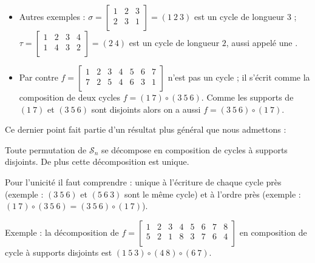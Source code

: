 \documentclass{book}
\begin{document}
\begin{itemize}
  \item Autres exemples :
$
\sigma = \left[\begin{smallmatrix}
 1 & 2 & 3 \\
 2 & 3 & 1 \\
        \end{smallmatrix} \right]
= (1\ 2\ 3)$ est un cycle de longueur $3$ ;
$
\tau = \left[\begin{smallmatrix}
 1 & 2 & 3 & 4 \\
 1 & 4 & 3 & 2 \\
        \end{smallmatrix} \right]
= (2\ 4)$ est un cycle de longueur $2$, aussi appelé une .

  \item Par contre
$f =\left[\begin{smallmatrix}
 1 & 2 & 3 & 4 & 5 & 6 & 7 \\
 7 & 2 & 5 & 4 & 6 & 3 & 1 \\
        \end{smallmatrix} \right]
$ n'est pas un cycle ; il s'écrit comme la composition de deux cycles
$f = (1\ 7) \circ (3\ 5\ 6)$. Comme les supports de $(1\ 7)$ et $(3\ 5\ 6)$ sont disjoints
alors on a aussi $f = (3\ 5\ 6) \circ (1\ 7)$.

\end{itemize}


\medskip

Ce dernier point fait partie d'un résultat plus général que nous admettons :
\begin{Theoreme}
Toute permutation de $\mathcal{S}_n$ se décompose en composition
de cycles à supports disjoints.
De plus cette décomposition est unique.
\end{Theoreme}

Pour l'unicité il faut comprendre : unique à l'écriture de chaque cycle près
(exemple : $(3\ 5\ 6)$ et $(5\ 6\ 3)$ sont le même cycle)
et à l'ordre près (exemple : $(1\ 7) \circ (3\ 5\ 6)= (3\ 5\ 6) \circ (1\ 7)$).


Exemple :
la décomposition de $
f = \left[\begin{smallmatrix}
 1 & 2 & 3 & 4 & 5 & 6 & 7 & 8 \\
 5 & 2 & 1 & 8 & 3 & 7 & 6 & 4 \\
        \end{smallmatrix} \right]
$
en composition de cycle à supports
disjoints est $(1\ 5\ 3) \circ (4\ 8) \circ (6\ 7)$.

\bigskip
\end{document}
